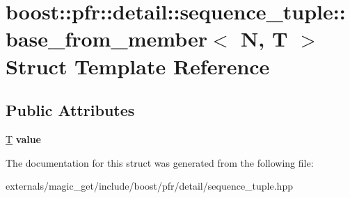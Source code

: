 \hypertarget{structboost_1_1pfr_1_1detail_1_1sequence__tuple_1_1base__from__member}{}\section{boost\+:\+:pfr\+:\+:detail\+:\+:sequence\+\_\+tuple\+:\+:base\+\_\+from\+\_\+member$<$ N, T $>$ Struct Template Reference}
\label{structboost_1_1pfr_1_1detail_1_1sequence__tuple_1_1base__from__member}
\subsection*{Public Attributes}
\begin{DoxyCompactItemize}
\item 
\mbox{\label{structboost_1_1pfr_1_1detail_1_1sequence__tuple_1_1base__from__member_a3646e7869c8c67ffe79590ff7a374713}} 
\mbox{\hyperlink{struct_t}{T}} {\bfseries value}
\end{DoxyCompactItemize}


The documentation for this struct was generated from the following file\+:\begin{DoxyCompactItemize}
\item 
externals/magic\+\_\+get/include/boost/pfr/detail/sequence\+\_\+tuple.\+hpp\end{DoxyCompactItemize}
